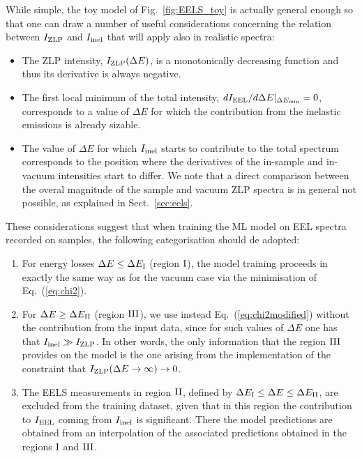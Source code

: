 While simple, the toy model of Fig.~\ref{fig:EELS_toy} is actually general enough so that one can draw
a number of useful considerations concerning the relation between $I_{\rm ZLP}$ and $I_{\rm inel}$
that will apply also in realistic spectra:

\begin{itemize}

\item The ZLP intensity, $I_{\rm ZLP}(\Delta E)$, is a monotonically decreasing function
  and thus its derivative is always negative.

\item  The first local minimum of the total intensity, $dI_{\rm EEL}/d\Delta E|_{\Delta E_{\rm min}}=0$, corresponds
  to a value of $\Delta E$ for which the contribution from the inelastic emissions is already
  sizable.

\item The value of $\Delta E$ for which $I_{\rm inel}$ starts to contribute to the total spectrum
  corresponds to the position where the derivatives of the in-sample and in-vacuum intensities
  start to differ.
  We note that a direct comparison between the overal magnitude of the sample and vacuum ZLP
  spectra is in general not possible, as explained in Sect.~\ref{sec:eels}. 
\end{itemize}

These considerations suggest that when training the ML model on EEL spectra recorded on samples,
the following categorisation should de adopted:

\begin{enumerate}

\item For energy losses $\Delta E \le \Delta E_{\rm I}$ (region $\rm I$),
  the model training  proceeds in exactly the same way as for the vacuum case
  via the minimisation of Eq.~(\ref{eq:chi2}).

\item  
  For $\Delta E \ge \Delta E_{\rm II}$ (region $\rm III$), we use instead Eq.~(\ref{eq:chi2modified})
  without the contribution from the input data, since for such values
  of $\Delta E$ one has that $I_{\rm inel}\gg I_{\rm ZLP}$.
  In other words, the only information that the region $\rm III$ provides
  on the model is the one arising from the implementation
  of the constraint that $I_{\rm ZLP}(\Delta E\to \infty)\to 0$.

\item The EELS measurements  in region $\rm II$, defined by  $\Delta E_{\rm I} \le \Delta E \le \Delta E_{\rm II}$,
  are excluded from the training dataset, given that in this region the contribution to $I_{\rm EEL}$
  coming from $I_{\rm inel}$ is significant.
  There the model predictions are obtained from an interpolation
  of the associated predictions obtained in the regions $\rm I$ and $\rm III$.

\end{enumerate}

